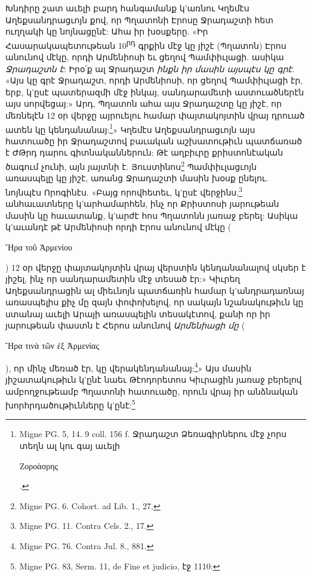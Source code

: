 \documentclass{article}
\begin{document}
{Խնդիրը շատ աւելի բարդ հանգամանք կ'առնու Կղեմէս Աղեքսանդրացւոյն քով, որ Պղատոնի Էրոսը Ջրադաշտի հետ ուղղակի կը նոյնացընէ: Ահա իր խօսքերը. «Իր Հասարակապետութեան 10\textsuperscript{րդ} գրքին մէջ կը յիշէ (Պղատոն) Էրոս անունով մէկը, որդի Արմենիոսի եւ ցեղով Պամփիւլացի. ասիկա \emph{Ջրադաշտն է}: Իրօ՛ք ալ Ջրադաշտ \emph{ինքն իր մասին այսպէս կը գրէ}. «Այս կը գրէ Ջրադաշտ, որդի Արմենիոսի, որ ցեղով Պամփիւլացի էր, երբ, կ'ըսէ պատերազմի մէջ ինկայ, սանդարամետի աստուածներէն այս սորվեցայ:» Արդ, Պղատոն ահա այս Ջրադաշտը կը յիշէ, որ մեռնելէն 12 օր վերջը այրուելու համար փայտակոյտին վրայ դրուած ատեն կը կենդանանայ:\footnote{Migne PG. 5, 14. 9 coll. 156 f. Ջրադաշտ Ձեռագիրներու մէջ չորս տեղն ալ կու գայ աւելի \begin{greek}Ζοροὰσρης\end{greek}.}» Կղեմէս Աղեքսանդրացւոյն այս հատուածը իր Ջրադաշտով բաւական աշխատութիւն պատճառած է ԺԹրդ դարու գիտնականներուն: Թէ աղբիւրը քրիստոնէական ծագում չունի, այն յայտնի է. Յուստինոս\footnote{Migne PG. 6. Cohort. ad Lib. 1., 27.} Պամփիւլացւոյն առասպելը կը յիշէ, առանց Ջրադաշտի մասին խօսք ընելու. նոյնպէս Որոգինէս. «Բայց որովհետեւ, կ'ըսէ վերջինս,\footnote{Migne PG. 11. Contra Cels. 2., 17.} անհաւատները կ'արհամարհեն, ինչ որ Քրիստոսի յարութեան մասին կը հաւատանք, կ'արժէ հոս Պղատոնն յառաջ բերել: Ասիկա կ'աւանդէ թէ Արմենիոսի որդի Էրոս անունով մէկը (\begin{greek}Ἤρα τοῦ Ἀρμενίου\end{greek}) 12 օր վերջը փայտակոյտին վրայ վերստին կենդանանալով սկսեր է յիշել, ինչ որ սանդարամետին մէջ տեսած էր:» Կիւրեղ Աղեքսանդրացին ալ միեւնոյն պատճառին համար կ'անդրադառնայ առասպելիս քիչ մը զայն փոփոխելով, որ սակայն նշանակութիւն կը ստանայ աւելի Արայի առասպելին տեսակէտով, քանի որ իր յարութեան փաստն է Հերոս անունով \emph{Արմենիացի մը} (\begin{greek}Ἥρα τινὰ τῶν ἐξ Ἀρμενίας\end{greek}), որ մինչ մեռած էր, կը վերակենդանանայ:\footnote{Migne PG. 76. Contra Jul. 8., 881.}» Այս մասին յիշատակութիւն կ'ընէ նաեւ Թէոդորետոս Կիւրացին յառաջ բերելով ամբողջութեամբ Պղատոնի հատուածը, որուն վրայ իր անձնական խորհրդածութիւնները կ'ընէ:\footnote{Migne PG. 83, Serm. 11, de Fine et judicio, էջ 1110:}

}
\end{document}
